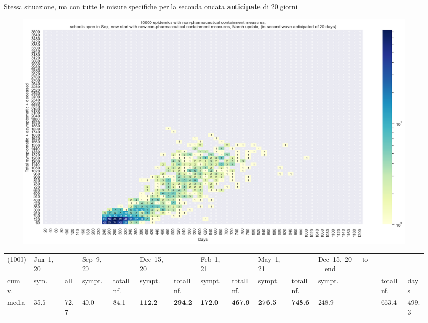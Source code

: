 \documentclass[]{beamer}
\begin{document}
\begin{frame}{Stessa situazione, ma con tutte le misure specifiche per la seconda ondata \textbf{{\color{red}anticipate}} di 20 giorni}


\begin{figure}[H]
\center
\includegraphics[scale=0.22]{10kForceWave2Contr2M-20.png}
\label{selForceWave2Contr2M-20}
\end{figure}


\begin{table}[H]
\center
\tiny
\begin{tabular}{p{0.4cm}p{0.3cm}p{0.3cm}p{0.3cm}p{0.3cm}p{0.3cm}p{0.3cm}p{0.3cm}p{0.3cm}p{0.3cm}p{0.3cm}p{0.3cm}p{0.3cm}p{0.4cm}}
\toprule
(1000) &  Jun~1,~20 & &  Sep~9,~20 & & Dec~15,~20 & & Feb~1,~21 & & May~1,~21 & & Dec~15,~20~~~to~~~end   \\
cum.~v. &  sym. &  all &  sympt. &  totalInf. &  sympt. &  totalInf. &  sympt. &  totalInf. &  sympt. &  totalInf. &  sympt. &  totalInf.  & days\\
\midrule
media  &     35.6 &                       72.7 &     40.0 &                       84.1 &    \textbf{{\color{red}112.2}} &                     \textbf{{\color{red} 294.2}} &    \textbf{172.0} &                      \textbf{467.9} &    \textbf{276.5} &                      \textbf{748.6} &              248.9 &                   663.4 &  499.3 \\
\bottomrule
\end{tabular}

\label{selForceWave2Contr2M-20Tab}
\end{table}


\end{frame}
\end{document}
